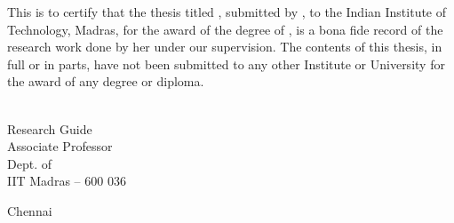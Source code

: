 \documentclass[MS]             %
              {iitmdiss}
\begin{document}
\title{\mythesistitle}

\author{\myname}

\date{\MakeUppercase {\mysubmissionmonth}}
\department{\MakeUppercase {\mydept}}

\maketitle

\certificate

\vspace*{0.5in}

\noindent 
This is to certify that the thesis titled {\bf \mythesistitle},
submitted by {\bf \myname}, to the Indian Institute of Technology,
Madras, for the award of the degree of {\bf \mydegree}, is
a bona fide record of the research work done by her under our
supervision.  The contents of this thesis, in full or in parts, have
not been submitted to any other Institute or University for the award
of any degree or diploma.

\vspace*{1.5in}

\begin{singlespacing}
  \hspace*{-0.25in}
  \parbox{2.5in}{
     \\
    \noindent Research Guide \\
    \noindent Associate Professor \\
    \noindent Dept. of \mydept\\
    \noindent IIT Madras -- 600 036} \hfill
  \parbox{1.25in}{               %
    \vspace*{0.75in} 
    \noindent Chennai\\          %
    \noindent \mysubmissiondate} %
\end{singlespacing}




\acknowledgements


\end{document}
